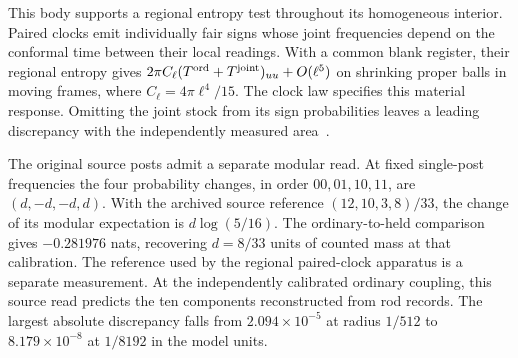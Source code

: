 \documentclass[11pt]{article}
\begin{document}
This body supports a regional entropy test throughout its homogeneous
interior. Paired clocks emit individually fair signs whose joint
frequencies depend on the conformal time between their local readings.
With a common blank register, their regional entropy gives
$2\pi C_\ell(T^{\rm ord}+T^{\rm joint})_{uu}+O(\ell^5)$ on shrinking
proper balls in moving frames, where $C_\ell=4\pi\ell^4/15$.
The clock law specifies this material response. Omitting the joint
stock from its sign probabilities leaves a leading discrepancy with
the independently measured area~\cite{ophEinstein}.

The original source posts admit a separate modular read. At fixed
single-post frequencies the four probability changes, in order
$00,01,10,11$, are $(d,-d,-d,d)$. With the archived source reference
$(12,10,3,8)/33$, the change of its modular expectation is $d\log(5/16)$.
The ordinary-to-held comparison gives $-0.281976$ nats, recovering
$d=8/33$ units of counted mass at that calibration. The reference
used by the regional paired-clock apparatus is a separate measurement.
At the independently calibrated ordinary coupling, this source read
predicts the ten components reconstructed from rod records. The
largest absolute discrepancy falls from $2.094\times10^{-5}$ at radius
$1/512$ to $8.179\times10^{-8}$ at $1/8192$ in the model units.
\end{document}
